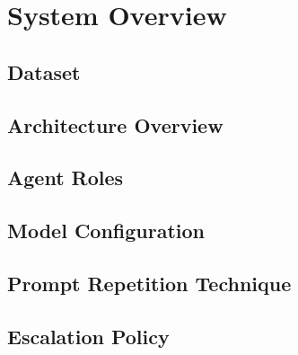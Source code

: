 \section{System Overview}


\subsection{Dataset}

\subsection{Architecture Overview}

\subsection{Agent Roles}

\subsection{Model Configuration}

\subsection{Prompt Repetition Technique}

\subsection{Escalation Policy}

